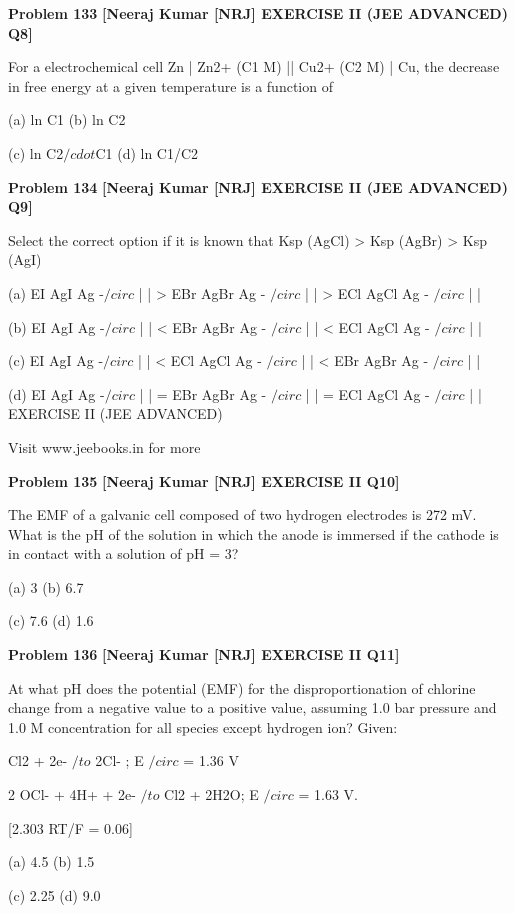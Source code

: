 \begin{problembox}
\textbf{Problem 133} \hfill \textbf{[Neeraj Kumar [NRJ] EXERCISE II (JEE ADVANCED) Q8]}
\label{q:ext-nrj_all_questions-133}

For a electrochemical cell Zn | Zn2+ (C1 M) || Cu2+ 
(C2 M) | Cu, the decrease in free energy at a given 
temperature is a function of
 
 (a) ln C1 
(b) ln C2
 
 (c) ln C2$/cdot$C1 
(d) ln C1/C2
\end{problembox}

\begin{problembox}
\textbf{Problem 134} \hfill \textbf{[Neeraj Kumar [NRJ] EXERCISE II (JEE ADVANCED) Q9]}
\label{q:ext-nrj_all_questions-134}

Select the correct option if it is known that Ksp 
(AgCl) > Ksp (AgBr) > Ksp (AgI)
 
 (a) EI
AgI Ag
-$/circ$
|
|
 > EBr
AgBr Ag
-
$/circ$
|
|
 > ECl
AgCl Ag
-
$/circ$
|
|
 
 (b) EI
AgI Ag
-$/circ$
|
|
 < EBr
AgBr Ag
-
$/circ$
|
|
 < ECl
AgCl Ag
-
$/circ$
|
|
 
 (c) EI
AgI Ag
-$/circ$
|
|
 < ECl
AgCl Ag
-
$/circ$
|
|
 < EBr
AgBr Ag
-
$/circ$
|
|
 
 (d) EI
AgI Ag
-$/circ$
|
|
 = EBr
AgBr Ag
-
$/circ$
|
|
 = ECl
AgCl Ag
-
$/circ$
|
|
EXERCISE II (JEE ADVANCED)
 
 
Visit www.jeebooks.in for more
\end{problembox}

\begin{problembox}
\textbf{Problem 135} \hfill \textbf{[Neeraj Kumar [NRJ] EXERCISE II Q10]}
\label{q:ext-nrj_all_questions-135}

The EMF of a galvanic cell composed of two 
hydrogen electrodes is 272 mV. What is the pH of 
the solution in which the anode is immersed if the 
cathode is in contact with a solution of pH = 3?
 
 (a) 3 
(b) 6.7
 
 (c) 7.6 
(d) 1.6
\end{problembox}

\begin{problembox}
\textbf{Problem 136} \hfill \textbf{[Neeraj Kumar [NRJ] EXERCISE II Q11]}
\label{q:ext-nrj_all_questions-136}

At what pH does the potential (EMF) for the 
disproportionation of chlorine change from a 
negative value to a positive value, assuming 1.0 
bar pressure and 1.0  M concentration for all 
species except hydrogen ion? Given:
 
  Cl2 + 2e- $/to$ 2Cl- ; E $/circ$ = 1.36 V
 
   2 OCl- + 4H+ + 2e- $/to$ Cl2 + 2H2O; E $/circ$ = 1.63 V.
 
  [2.303 RT/F = 0.06]
 
 (a) 4.5 
(b) 1.5
 
 (c) 2.25 
(d) 9.0
\end{problembox}

